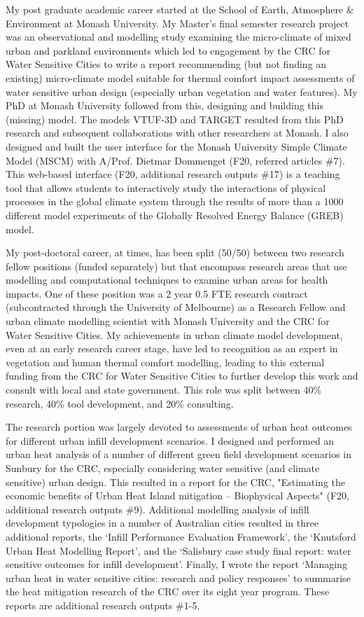 My post graduate academic career started at the School of Earth, Atmosphere \& Environment  at Monash University. My Master's final semester research project was an observational and modelling study examining the micro-climate of mixed urban and parkland environments which led to engagement by the CRC for Water Sensitive Cities to write a report recommending (but not finding an existing) micro-climate model suitable for thermal comfort impact assessments of water sensitive urban design (especially urban vegetation and water features). My PhD at Monash University followed from this, designing and building this (missing) model. The models VTUF-3D and TARGET resulted from this PhD research and subsequent collaborations with other researchers at Monash. I also designed and built the user interface for the Monash University Simple Climate Model (MSCM) with A/Prof. Dietmar Dommenget (F20, referred articles \#7). This web-based interface (F20, additional research outputs \#17) is a teaching tool that allows students to interactively study the interactions of physical processes in the global climate system through the results of more than a 1000 different model experiments of the Globally Resolved Energy Balance (GREB) model.

My post-doctoral career, at times, has been split (50/50) between two research fellow positions (funded separately) but that encompass research areas that use modelling and computational techniques to examine urban areas for health impacts. One of these position was a 2 year 0.5 FTE research contract (subcontracted through the University of Melbourne) as a Research Fellow and urban climate modelling scientist with Monash University and the CRC for Water Sensitive Cities. My achievements in urban climate model development, even at an early research career stage, have led to recognition as an expert in vegetation and human thermal comfort modelling, leading to this external funding from the CRC for Water Sensitive Cities to further develop this work and consult with local and state government. This role was split between 40\% research, 40\% tool development, and 20\% consulting. 

The research portion was largely devoted to assessments of urban heat outcomes for different urban infill development scenarios. I designed and performed an urban heat analysis of a number of different green field development scenarios in Sunbury for the CRC, especially considering water sensitive (and climate sensitive) urban design. This resulted in a report for the CRC, "Estimating the economic benefits of Urban Heat Island mitigation – Biophysical Aspects" (F20, additional research outputs \#9). Additional modelling analysis of infill development typologies in a number of Australian cities resulted in three additional reports, the `Infill Performance Evaluation Framework', the `Knutsford Urban Heat Modelling Report', and the `Salisbury case study final report: water sensitive outcomes for infill development'. Finally, I wrote the report `Managing urban heat in water sensitive cities: research and policy responses' to summarise the heat mitigation research of the CRC over its eight year program. These reports are additional research outputs \#1-5.

